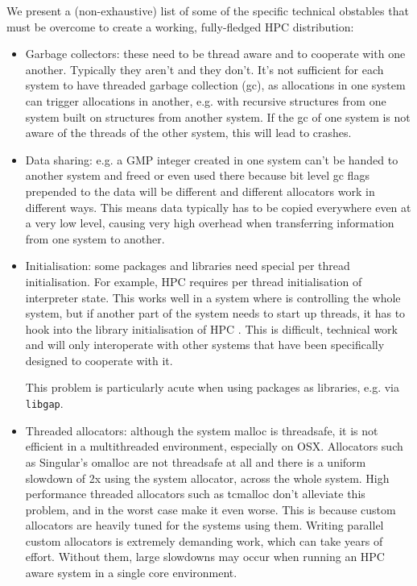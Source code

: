 \documentclass{deliverablereport}
\begin{document}
We present a (non-exhaustive) list of some of the specific technical obstables that must be
overcome to create a working, fully-fledged HPC distribution:

\begin{itemize}
\item Garbage collectors: these need to be thread aware and to cooperate with one another.
  Typically they aren't and they don't. It's not sufficient for each system to have threaded
  garbage collection (gc), as allocations in one system can trigger allocations in another, e.g.
  with recursive structures from one system built on structures from another system. If the
  gc of one system is not aware of the threads of the other system, this will lead to crashes.

\item Data sharing: e.g. a GMP integer created in one system can't be handed to another system
  and freed or even used there because bit level gc flags prepended to the data will be different
  and different allocators work in different ways. This means data typically has to be copied
  everywhere even at a very low level, causing very high overhead when transferring information
  from one system to another.

\item Initialisation: some packages and libraries need special per thread initialisation. For
  example, HPC \GAP requires per thread initialisation of interpreter state. This works well in a
  system where \GAP is controlling the whole system, but if another part of the system needs to
  start up threads, it has to hook into the library initialisation of HPC \GAP. This is difficult,
  technical work and will only interoperate with other systems that have been specifically
  designed to cooperate with it.

  This problem is particularly acute when using packages as libraries, e.g. via \texttt{libgap}.

\item Threaded allocators: although the system malloc is threadsafe, it is not efficient in a
  multithreaded environment, especially on OSX. Allocators such as Singular's omalloc are not
  threadsafe at all and there is a uniform slowdown of 2x using the system allocator, across
  the whole system. High performance threaded allocators such as tcmalloc don't alleviate this
  problem, and in the worst case make it even worse. This is because custom allocators are
  heavily tuned for the systems using them. Writing parallel custom allocators is extremely
  demanding work, which can take years of effort. Without them, large slowdowns may occur when
  running an HPC aware system in a single core environment.


\end{itemize}
\end{document}
